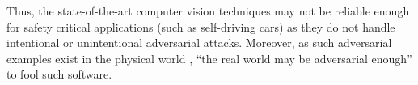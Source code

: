 Thus, the state-of-the-art computer vision techniques may not be reliable enough for safety critical applications (such as self-driving cars) as they do not handle intentional or unintentional adversarial attacks. Moreover, as such adversarial examples exist in the physical world \citep{Kurakin:2016vw,Eykholt:2018vk}, ``the real world may be adversarial enough'' \citep{Pezzementi:2018tq} to fool such software.
